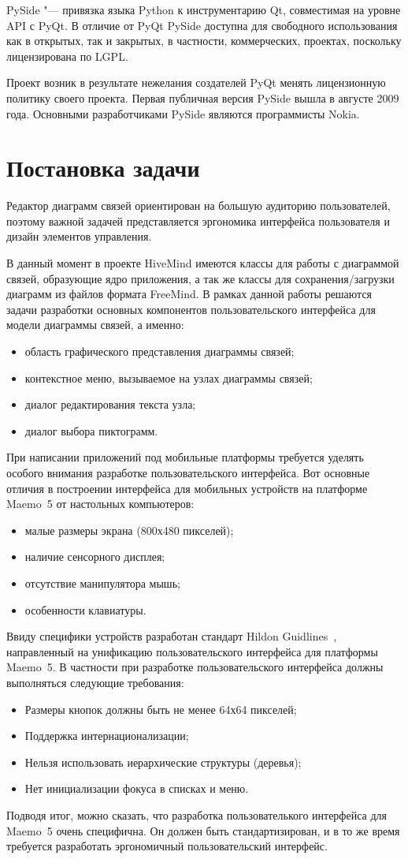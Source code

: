 PySide "--- привязка языка Python к инструментарию Qt, совместимая на уровне API с PyQt. В отличие от PyQt PySide доступна для свободного использования как в открытых, так и закрытых, в частности, коммерческих, проектах, поскольку лицензирована по LGPL.

Проект возник в результате нежелания создателей PyQt менять лицензионную политику своего проекта.
Первая публичная версия PySide вышла в августе 2009 года. Основными разработчиками PySide являются программисты Nokia.

\section{Постановка задачи}\label{sec:statement_task}

Редактор диаграмм связей ориентирован на большую аудиторию пользователей, поэтому важной задачей представляется эргономика интерфейса пользователя и дизайн элементов управления.

В данный момент в проекте HiveMind имеются классы для работы с диаграммой связей, образующие ядро приложения, а так же классы для сохранения/загрузки диаграмм из файлов формата FreeMind.
В рамках данной работы решаются задачи разработки основных компонентов пользовательского интерфейса для модели диаграммы связей, а именно:
\begin{itemize}
\item
область графического представления диаграммы связей;
\item
контекстное меню, вызываемое на узлах диаграммы связей;
\item
диалог редактирования текста узла;
\item
диалог выбора пиктограмм.
\end{itemize}

При написании приложений под мобильные платформы требуется уделять особого внимания разработке пользовательского интерфейса. Вот основные отличия в построении интерфейса для мобильных устройств на платформе Maemo~5 от настольных компьютеров:
\begin{itemize}
\item малые размеры экрана (800х480 пикселей);
\item наличие сенсорного дисплея;
\item отсутствие манипулятора мышь;
\item особенности клавиатуры.
\end{itemize}

Ввиду специфики устройств разработан стандарт Hildon Guidlines~\cite{hildon}, направленный на унификацию пользовательского интерфейса для платформы Maemo~5. В частности при разработке пользовательского интерфейса должны выполняться следующие требования:
\begin{itemize}
\item Размеры кнопок должны быть не менее 64х64 пикселей;
\item Поддержка интернационализации;
\item Нельзя использовать иерархические структуры (деревья);
\item Нет инициализации фокуса в списках и меню.
\end{itemize}

Подводя итог, можно сказать, что разработка пользователького интерфейса для Maemo~5 очень специфична. Он должен быть стандартизирован, и в то же время требуется разработать эргономичный пользовательский интерфейс.